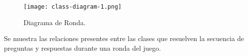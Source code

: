 \documentclass[titlepage,a4paper]{article}
\begin{document}
\begin{figure}[H]
\centering
\texttt{[image: class-diagram-1.png]}
\caption{\label{fig:class01}Diagrama de Ronda.}
\end{figure}

Se muestra las relaciones presentes entre las clases que resuelven la secuencia de preguntas y respuestas durante una ronda del juego.




\end{document}
